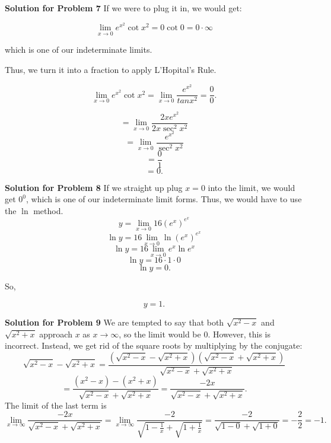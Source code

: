 \documentclass{article}
\begin{document}
\vspace{1cm}


\newpage
\textbf{Solution for Problem 7} If we were to plug it in, we would get:

\[\lim_{x \to 0}e^{x^2}\cot{x^2} = 0\cot0 = 0\cdot\infty\]

which is one of our indeterminate limits.

Thus, we turn it into a fraction to apply L'Hopital's Rule.

\[\lim_{x \to 0}e^{x^2}\cot{x^2} = \lim_{x \to 0} \frac {e^{x^2}} {tan x^2} = \frac {0} {0}.\]

\[ = \lim_{x \to 0} \frac {2xe^{x^2}} {2x \sec^{2}{x^2}}\]
\[= \lim_{x \to 0} \frac {e^{x^2}} {\sec^{2}{x^2}}\]
\[= \frac {0} {1}\]
\[= \boxed{0}.\]

\vspace{1cm}



\textbf{Solution for Problem 8} If we straight up plug $x = 0$ into the limit, we would get $0^{0}$, which is one of our indeterminate limit forms. Thus, we would have to use the $\ln$ method.\\

\[\displaystyle y = \lim_{x \to 0} 16 \left( e^x \right)^{e^{x}} \]
\[\ln{y} = 16\lim_{x \to 0} \ln{\left( e^x \right)^{e^{x}}}\]
\[\ln{y} = 16\lim_{x \to 0} e^{x} \ln{e^x}\]
\[\ln{y} = 16 \cdot 1 \cdot 0\]
\[\ln{y} = 0.\]

So,

\[y = \boxed{1}.\] 

\vspace{1cm}


\newpage
\textbf{Solution for Problem 9} We are tempted to say that both $\sqrt{x^2 - x}$ and $\sqrt{x^2 + x}$ approach $x$ as $x \rightarrow \infty$, so the limit would be $0$. However, this is incorrect. Instead, we get rid of the square roots by multiplying by the conjugate:\\

$$  \sqrt{x^2-x} - \sqrt{x^2+x} = \frac{\left( \sqrt{x^2-x} - \sqrt{x^2+x} \right)  \left( \sqrt{x^2-x} + \sqrt{x^2+x} \right)}{\sqrt{x^2-x} + \sqrt{x^2+x}}$$
$$ = \frac{(x^2 - x) - (x^2 + x)}{ \sqrt{x^2-x} + \sqrt{x^2+x}} = \frac{-2x}{ \sqrt{x^2-x} + \sqrt{x^2+x}}.$$
The limit of the last term is
$$\lim_{x \rightarrow \infty} \frac{-2x}{ \sqrt{x^2-x} + \sqrt{x^2+x}} = \lim_{x \rightarrow \infty} \frac{-2}{\sqrt{1 - \frac{1}{x}} + \sqrt{1 + \frac{1}{x}}} = \frac{-2}{\sqrt{1 - 0} + \sqrt{1 + 0}} = -\frac{2}{2} = \boxed{-1}.$$
\end{document}
